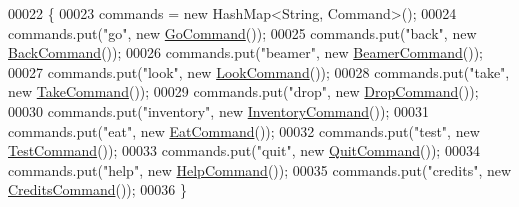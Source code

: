 \begin{DoxyCode}
00022                           \{
00023         commands = \textcolor{keyword}{new} HashMap<String, Command>();
00024         commands.put(\textcolor{stringliteral}{"go"}, \textcolor{keyword}{new} \hyperlink{classpkg__commands_1_1GoCommand}{GoCommand}());
00025         commands.put(\textcolor{stringliteral}{"back"}, \textcolor{keyword}{new} \hyperlink{classpkg__commands_1_1BackCommand}{BackCommand}());
00026         commands.put(\textcolor{stringliteral}{"beamer"}, \textcolor{keyword}{new} \hyperlink{classpkg__commands_1_1BeamerCommand}{BeamerCommand}());
00027         commands.put(\textcolor{stringliteral}{"look"}, \textcolor{keyword}{new} \hyperlink{classpkg__commands_1_1LookCommand}{LookCommand}());
00028         commands.put(\textcolor{stringliteral}{"take"}, \textcolor{keyword}{new} \hyperlink{classpkg__commands_1_1TakeCommand}{TakeCommand}());
00029         commands.put(\textcolor{stringliteral}{"drop"}, \textcolor{keyword}{new} \hyperlink{classpkg__commands_1_1DropCommand}{DropCommand}());
00030         commands.put(\textcolor{stringliteral}{"inventory"}, \textcolor{keyword}{new} \hyperlink{classpkg__commands_1_1InventoryCommand}{InventoryCommand}());
00031         commands.put(\textcolor{stringliteral}{"eat"}, \textcolor{keyword}{new} \hyperlink{classpkg__commands_1_1EatCommand}{EatCommand}());
00032         commands.put(\textcolor{stringliteral}{"test"}, \textcolor{keyword}{new} \hyperlink{classpkg__commands_1_1TestCommand}{TestCommand}());
00033         commands.put(\textcolor{stringliteral}{"quit"}, \textcolor{keyword}{new} \hyperlink{classpkg__commands_1_1QuitCommand}{QuitCommand}());
00034         commands.put(\textcolor{stringliteral}{"help"}, \textcolor{keyword}{new} \hyperlink{classpkg__commands_1_1HelpCommand}{HelpCommand}());
00035         commands.put(\textcolor{stringliteral}{"credits"}, \textcolor{keyword}{new} \hyperlink{classpkg__commands_1_1CreditsCommand}{CreditsCommand}());
00036     \}
\end{DoxyCode}


